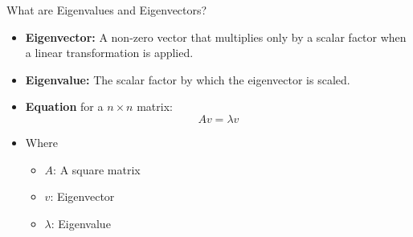 \documentclass[serif, aspectratio=169]{beamer}
\begin{document}
\begin{frame}{What are Eigenvalues and Eigenvectors?}
    \begin{itemize}
        \item \textbf{Eigenvector:} A non-zero vector that  multiplies only by a scalar factor when a linear transformation is applied.
        \item \textbf{Eigenvalue:} The scalar factor by which the eigenvector is scaled.
        \item \textbf{Equation} for a $n \times n$ matrix:
        $$Av = \lambda v$$
        \item Where
        \begin{itemize}
            \item $A$: A square matrix
            \item $v$: Eigenvector
            \item $\lambda$: Eigenvalue
        \end{itemize}
    \end{itemize}
\end{frame}
\end{document}
